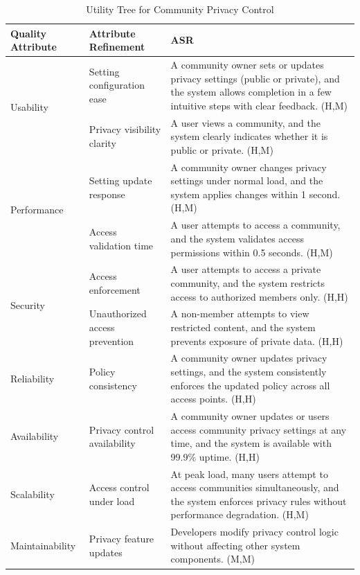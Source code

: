 \documentclass{article}
\begin{document}
\begin{table}[H]
\centering
\caption{Utility Tree for Community Privacy Control}
\begin{tabular}{|p{3cm}|p{4cm}|p{7cm}|}
\hline
\textbf{Quality Attribute} & \textbf{Attribute Refinement} & \textbf{ASR} \\
\hline

\multirow{2}{*}{Usability}
& Setting configuration ease
& A community owner sets or updates privacy settings (public or private), and the system allows completion in a few intuitive steps with clear feedback. (H,M) \\
\cline{2-3}
& Privacy visibility clarity
& A user views a community, and the system clearly indicates whether it is public or private. (H,M) \\
\hline

\multirow{2}{*}{Performance}
& Setting update response
& A community owner changes privacy settings under normal load, and the system applies changes within 1 second. (H,M) \\
\cline{2-3}
& Access validation time
& A user attempts to access a community, and the system validates access permissions within 0.5 seconds. (H,M) \\
\hline

\multirow{2}{*}{Security}
& Access enforcement
& A user attempts to access a private community, and the system restricts access to authorized members only. (H,H) \\
\cline{2-3}
& Unauthorized access prevention
& A non-member attempts to view restricted content, and the system prevents exposure of private data. (H,H) \\
\hline

Reliability
& Policy consistency
& A community owner updates privacy settings, and the system consistently enforces the updated policy across all access points. (H,H) \\
\hline

Availability
& Privacy control availability
& A community owner updates or users access community privacy settings at any time, and the system is available with 99.9\% uptime. (H,H) \\
\hline

Scalability
& Access control under load
& At peak load, many users attempt to access communities simultaneously, and the system enforces privacy rules without performance degradation. (H,M) \\
\hline

Maintainability
& Privacy feature updates
& Developers modify privacy control logic without affecting other system components. (M,M) \\
\hline


\end{tabular}
\end{table}
\end{document}
